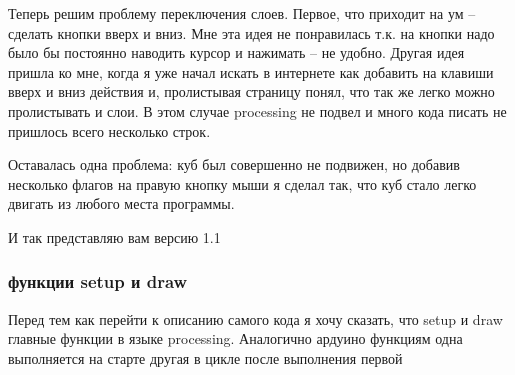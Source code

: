 \documentclass[a4paper, 12pt]{article}
\begin{document}

Теперь решим проблему переключения слоев. Первое, что приходит на ум -- сделать
кнопки вверх и вниз. Мне эта идея не понравилась т.к. на кнопки надо было бы 
постоянно наводить курсор и нажимать -- не удобно. Другая идея пришла ко мне,
когда я уже начал искать в интернете как добавить на клавиши вверх и вниз 
действия и, пролистывая страницу понял, что так же легко можно пролистывать и 
слои. В этом случае processing не подвел и много кода писать не пришлось всего 
несколько строк.

Оставалась одна проблема: куб был совершенно не подвижен, но добавив несколько
флагов на правую кнопку мыши я сделал так, что куб стало легко двигать из 
любого места программы.


И так представляю вам версию 1.1

\subsubsection{функции setup и draw}

Перед тем как перейти к описанию самого кода я хочу сказать, что setup и draw
главные функции в языке processing. Аналогично ардуино функциям одна 
выполняется на старте другая в цикле после выполнения первой 
\end{document}
